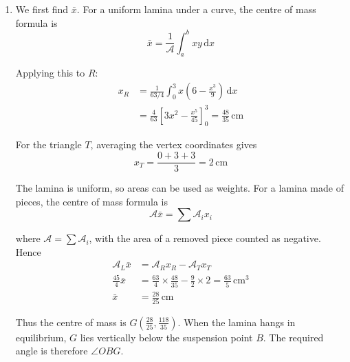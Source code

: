 \documentclass[leqno]{article}
\begin{document}
\begin{enumerate}[
  label=\textbf{\arabic*.},
  leftmargin=*,
  topsep=0pt,
  partopsep=0pt,
  parsep=0pt
]
\begin{djsSolution}
\begin{enumerate}[label=\textbf{(\alph*)}, start=1]
The centre of mass of a uniform triangular lamina is \(\frac23\) of the way along a median from the vertex, so its coordinates are the means of the vertices' coordinates. For \(T\) this gives
\[
y_T=\frac{0+0+3}{3}=1\,\mathrm{cm}
\]

The lamina is uniform, so areas can be used as weights. For a lamina made of pieces, the centre of mass formula is
\[
\mathcal{A}\bar{y}=\sum\mathcal{A}_iy_i
\]

where \(\mathcal{A}=\sum\mathcal{A}_i\), with the area of a removed piece counted as negative. Hence
\begin{align*}
\mathcal{A}_L\bar{y}&=\mathcal{A}_Ry_R-\mathcal{A}_Ty_T\\
\frac{45}{4}\bar{y}&=\frac{63}{4}\times\frac{132}{49}-\frac92\times1
=\frac{531}{14}\,\mathrm{cm^3}\\
\bar{y}&=\frac{118}{35}\,\mathrm{cm}
\end{align*}

\item
We first find \(\bar{x}\). For a uniform lamina under a curve, the centre of mass formula is
\[
\bar{x}=\frac{1}{\mathcal{A}}\int_a^b xy\,\mathrm{d}x
\]

Applying this to \(R\):
\begin{align*}
x_R
&=\frac{1}{63/4}\int_0^3 x\left(6-\frac{x^3}{9}\right)\,\mathrm{d}x\\
&=\frac{4}{63}\left[3x^2-\frac{x^5}{45}\right]_0^3
=\frac{48}{35}\,\mathrm{cm}
\end{align*}

For the triangle \(T\), averaging the vertex coordinates gives
\[
x_T=\frac{0+3+3}{3}=2\,\mathrm{cm}
\]

The lamina is uniform, so areas can be used as weights. For a lamina made of pieces, the centre of mass formula is
\[
\mathcal{A}\bar{x}=\sum\mathcal{A}_ix_i
\]

where \(\mathcal{A}=\sum\mathcal{A}_i\), with the area of a removed piece counted as negative. Hence
\begin{align*}
\mathcal{A}_L\bar{x}&=\mathcal{A}_Rx_R-\mathcal{A}_Tx_T\\
\frac{45}{4}\bar{x}&=\frac{63}{4}\times\frac{48}{35}-\frac92\times2
=\frac{63}{5}\,\mathrm{cm^3}\\
\bar{x}&=\frac{28}{25}\,\mathrm{cm}
\end{align*}

Thus the centre of mass is \(G\left(\frac{28}{25},\frac{118}{35}\right)\). When the lamina hangs in equilibrium, \(G\) lies vertically below the suspension point \(B\). The required angle is therefore \(\angle OBG\).


\end{enumerate}
\end{djsSolution}
\end{enumerate}
\end{document}
